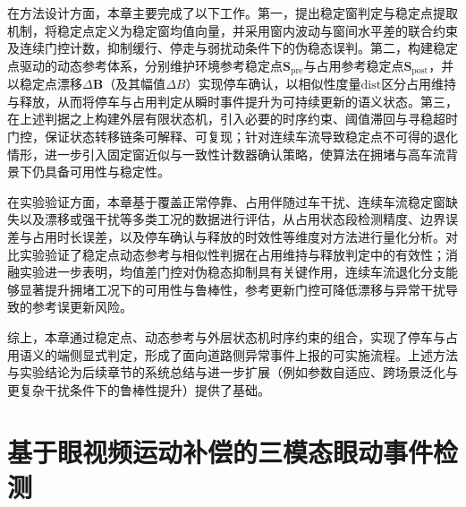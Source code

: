 \documentclass{xdupgthesis}
\begin{document}
在方法设计方面，本章主要完成了以下工作。第一，提出稳定窗判定与稳定点提取机制，将稳定点定义为稳定窗均值向量，并采用窗内波动与窗间水平差的联合约束及连续门控计数，抑制缓行、停走与弱扰动条件下的伪稳态误判。第二，构建稳定点驱动的动态参考体系，分别维护环境参考稳定点$\mathbf{S}_{\mathrm{pre}}$与占用参考稳定点$\mathbf{S}_{\mathrm{post}}$，并以稳定点漂移$\Delta\mathbf{B}$（及其幅值$\Delta B$）实现停车确认，以相似性度量$\mathrm{dist}$区分占用维持与释放，从而将停车与占用判定从瞬时事件提升为可持续更新的语义状态。第三，在上述判据之上构建外层有限状态机，引入必要的时序约束、阈值滞回与寻稳超时门控，保证状态转移链条可解释、可复现；针对连续车流导致稳定点不可得的退化情形，进一步引入固定窗近似与一致性计数器确认策略，使算法在拥堵与高车流背景下仍具备可用性与稳定性。

在实验验证方面，本章基于覆盖正常停靠、占用伴随过车干扰、连续车流稳定窗缺失以及漂移或强干扰等多类工况的数据进行评估，从占用状态段检测精度、边界误差与占用时长误差，以及停车确认与释放的时效性等维度对方法进行量化分析。对比实验验证了稳定点动态参考与相似性判据在占用维持与释放判定中的有效性；消融实验进一步表明，均值差门控对伪稳态抑制具有关键作用，连续车流退化分支能够显著提升拥堵工况下的可用性与鲁棒性，参考更新门控可降低漂移与异常干扰导致的参考误更新风险。

综上，本章通过稳定点、动态参考与外层状态机时序约束的组合，实现了停车与占用语义的端侧显式判定，形成了面向道路侧异常事件上报的可实施流程。上述方法与实验结论为后续章节的系统总结与进一步扩展（例如参数自适应、跨场景泛化与更复杂干扰条件下的鲁棒性提升）提供了基础。














































\chapter{基于眼视频运动补偿的三模态眼动事件检测}
\end{document}

